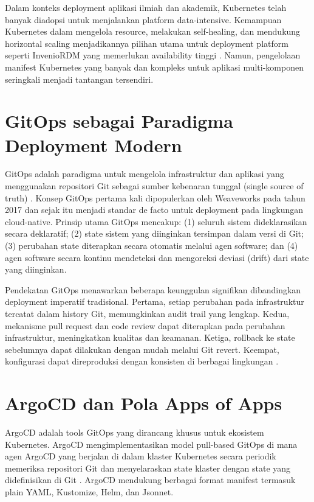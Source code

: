 Dalam konteks deployment aplikasi ilmiah dan akademik, Kubernetes telah banyak diadopsi untuk menjalankan platform data-intensive. Kemampuan Kubernetes dalam mengelola resource, melakukan self-healing, dan mendukung horizontal scaling menjadikannya pilihan utama untuk deployment platform seperti InvenioRDM yang memerlukan availability tinggi \citep{kubernetes2024}. Namun, pengelolaan manifest Kubernetes yang banyak dan kompleks untuk aplikasi multi-komponen seringkali menjadi tantangan tersendiri.

\section{GitOps sebagai Paradigma Deployment Modern}

GitOps adalah paradigma untuk mengelola infrastruktur dan aplikasi yang menggunakan repositori Git sebagai sumber kebenaran tunggal (single source of truth) \citep{gitops2023}. Konsep GitOps pertama kali dipopulerkan oleh Weaveworks pada tahun 2017 dan sejak itu menjadi standar de facto untuk deployment pada lingkungan cloud-native. Prinsip utama GitOps mencakup: (1) seluruh sistem dideklarasikan secara deklaratif; (2) state sistem yang diinginkan tersimpan dalam versi di Git; (3) perubahan state diterapkan secara otomatis melalui agen software; dan (4) agen software secara kontinu mendeteksi dan mengoreksi deviasi (drift) dari state yang diinginkan.

Pendekatan GitOps menawarkan beberapa keunggulan signifikan dibandingkan deployment imperatif tradisional. Pertama, setiap perubahan pada infrastruktur tercatat dalam history Git, memungkinkan audit trail yang lengkap. Kedua, mekanisme pull request dan code review dapat diterapkan pada perubahan infrastruktur, meningkatkan kualitas dan keamanan. Ketiga, rollback ke state sebelumnya dapat dilakukan dengan mudah melalui Git revert. Keempat, konfigurasi dapat direproduksi dengan konsisten di berbagai lingkungan \citep{gitops2023}.

\section{ArgoCD dan Pola Apps of Apps}

ArgoCD adalah tools GitOps yang dirancang khusus untuk ekosistem Kubernetes. ArgoCD mengimplementasikan model pull-based GitOps di mana agen ArgoCD yang berjalan di dalam klaster Kubernetes secara periodik memeriksa repositori Git dan menyelaraskan state klaster dengan state yang didefinisikan di Git \citep{argocd2024}. ArgoCD mendukung berbagai format manifest termasuk plain YAML, Kustomize, Helm, dan Jsonnet.


